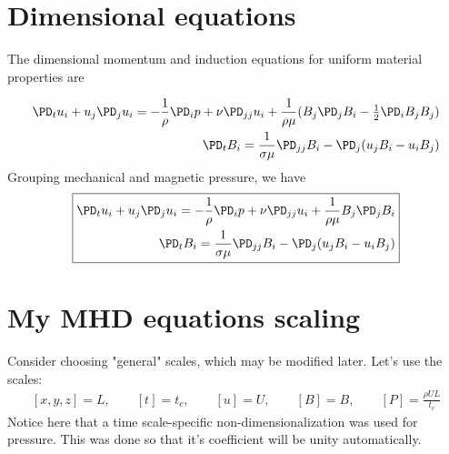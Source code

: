 \documentclass[11pt]{article}
\begin{document}
\doublespacing
\MOONSTITLE
\maketitle

\section{Dimensional equations}
The dimensional momentum and induction equations for uniform material properties are

\begin{equation}\begin{aligned}
\PD_t u_i+u_j\PD_j u_i = -\frac{1}{\rho} \PD_i p+ \nu \PD_{jj} u_i + \frac{1}{\rho \mu} (B_j \PD_j B_i - \tfrac{1}{2} \PD_i B_j B_j) \\
\PD_t B_i = \frac{1}{\sigma \mu} \PD_{jj} B_i - \PD_j (u_j B_i - u_i B_j)
\end{aligned}\end{equation}
Grouping mechanical and magnetic pressure, we have
\begin{equation}\boxed{\begin{aligned}
\PD_t u_i+u_j\PD_j u_i = -\frac{1}{\rho} \PD_i p+ \nu \PD_{jj} u_i + \frac{1}{\rho \mu} B_j \PD_j B_i \\
\PD_t B_i = \frac{1}{\sigma \mu} \PD_{jj} B_i - \PD_j (u_j B_i - u_i B_j)
\end{aligned}}\end{equation}

\section{My MHD equations scaling}
Consider choosing "general" scales, which may be modified later. Let's use the scales:
\begin{equation}\begin{aligned}
	[x,y,z] = L, \qquad
	[t] = t_c, \qquad
	[u] = U, \qquad
	[B] = B, \qquad
	[P] = \frac{\rho U L}{t_c}
\end{aligned} \end{equation}
Notice here that a time scale-specific non-dimensionalization was used for pressure. This was done so that it's coefficient will be unity automatically.
\end{document}
